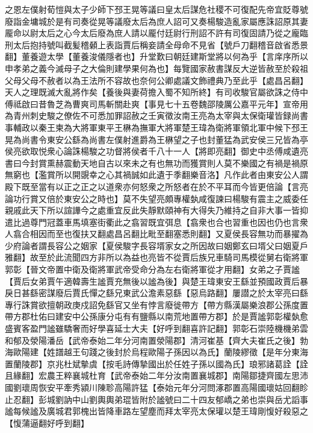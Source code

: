 之恩左僕射荀愷與太子少師下邳王晃等議曰皇太后謀危社稷不可復配先帝宜貶尊號廢詣金墉城於是有司奏從晃等議廢太后為庶人詔可又奏楊駿造亂家屬應誅詔原其妻龎命以尉太后之心今太后廢為庶人請以龎付廷尉行刑詔不許有司復固請乃從之龐臨刑太后抱持號叫截髪稽顙上表詣賈后稱妾請全母命不見省【號戶刀翻稽音啟省悉景翻】董養遊太學【董養浚儀隱者也】升堂歎曰朝廷建斯堂將以何為乎【言庠序所以申孝弟之義今滅母子之大倫則建學果何為也】每覽國家赦書謀反大逆皆赦至於殺祖父母父母不赦者以為王法所不容故也奈何公卿處議文飾禮典乃至此乎【處昌呂翻】天人之理既滅大亂將作矣【養後與妻荷擔入蜀不知所終】有司收駿官屬欲誅之侍中傅祗啟曰昔魯芝為曹爽司馬斬關赴爽【事見七十五卷魏邵陵厲公嘉平元年】宣帝用為青州刺史駿之僚佐不可悉加罪詔赦之壬寅徵汝南王亮為太宰與太保衛瓘皆録尚書事輔政以秦王柬為大將軍東平王楙為撫軍大將軍楚王瑋為衛將軍領北軍中候下邳王晃為尚書令東安公繇為尚書左僕射進爵為王楙望之子也封董猛為武安侯三兄皆為亭侯亮欲取悦衆心論誅楊駿之功督將侯者千八十一人【將即亮翻】御史中丞傅咸遺亮書曰今封賞熏赫震動天地自古以來未之有也無功而獲賞則人莫不樂國之有禍是禍原無窮也【濫賞所以開覬幸之心其禍誠如此遺于季翻樂音洛】凡作此者由東安公人謂殿下既至當有以正之正之以道衆亦何怒衆之所怒者在於不平耳而今皆更倍論【言亮論功行賞又倍於東安公之時也】莫不失望亮頗專權埶咸復諫曰楊駿有震主之威委任親戚此天下所以諠譁今之處重宜反此失靜默頤神有大得失乃維持之自非大事一皆抑遣比過尊門冠蓋車馬填塞街衢此之翕習既宜弭息【翕衆也合也習重也因也仍也言衆人翕合相因而至也復扶又翻處昌呂翻比毗至翻塞悉則翻】又夏侯長容無功而暴擢為少府論者謂長容公之姻家【夏侯駿字長容壻家女之所因故曰姻鄭玄曰壻父曰姻夏戶雅翻】故至於此流聞四方非所以為益也亮皆不從賈后族兄車騎司馬模從舅右衛將軍郭彰【晉文帝置中衛及衛將軍武帝受命分為左右衛將軍從才用翻】女弟之子賈謐【賈后女弟賈午適韓壽生謐賈充無後以謐為後】與楚王瑋東安王繇並預國政賈后暴戾日甚繇密謀廢后賈氏憚之繇兄東武公澹素惡繇【惡烏路翻】屢譛之於太宰亮曰繇專行誅賞欲擅朝政庚戍詔免繇官又坐有悖言廢徙帶方【帶方縣漢屬樂浪郡公孫度置帶方郡杜佑曰建安中公孫康分屯有有鹽縣以南荒地置帶方郡】於是賈謐郭彰權埶愈盛賓客盈門謐雖驕奢而好學喜延士大夫【好呼到翻喜許記翻】郭彰石崇陸機機弟雲和郁及滎陽潘岳【武帝泰始二年分河南置滎陽郡】清河崔基【齊大夫崔氏之後】勃海歐陽建【姓譜越王句踐之後封於烏程歐陽子孫因以為氏】蘭陵繆徵【是年分東海置蘭陵郡】京兆杜斌摰虞【按毛詩傳摯國出於任姓子孫以國為氏】琅邪諸葛詮【詮且緣翻】宏農王粹襄城杜育【武帝泰始二年分汝南置襄城郡】南陽鄒捷齊國左思沛國劉瓌周恢安平牽秀潁川陳聄高陽許猛【泰始元年分河問涿郡置高陽國瓌姑回翻眕止忍翻】彭城劉訥中山劉輿輿弟琨皆附於謐號曰二十四友郁嶠之弟也崇與岳尤謟事謐每候謐及廣城君郭槐出皆降車路左望塵而拜太宰亮太保瓘以楚王瑋剛愎好殺惡之【愎蒲逼翻好呼到翻】

